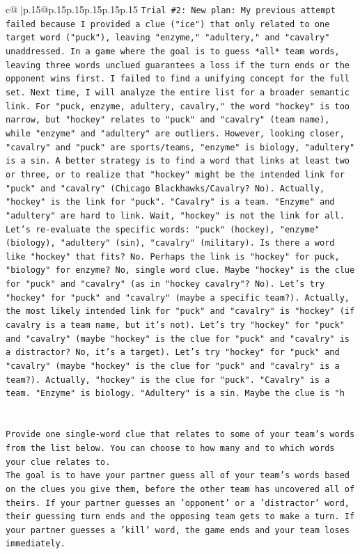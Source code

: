 \documentclass{article}
\begin{document}
{\begin{supertabular}{c@{$\;$}|p{.15\linewidth}@{}p{.15\linewidth}p{.15\linewidth}p{.15\linewidth}p{.15\linewidth}p{.15\linewidth}}
{{{\texttt{Trial \#2: New plan: My previous attempt failed because I provided a clue ("ice") that only related to one target word ("puck"), leaving "enzyme," "adultery," and "cavalry" unaddressed. In a game where the goal is to guess *all* team words, leaving three words unclued guarantees a loss if the turn ends or the opponent wins first. I failed to find a unifying concept for the full set. Next time, I will analyze the entire list for a broader semantic link. For "puck, enzyme, adultery, cavalry," the word "hockey" is too narrow, but "hockey" relates to "puck" and "cavalry" (team name), while "enzyme" and "adultery" are outliers. However, looking closer, "cavalry" and "puck" are sports/teams, "enzyme" is biology, "adultery" is a sin. A better strategy is to find a word that links at least two or three, or to realize that "hockey" might be the intended link for "puck" and "cavalry" (Chicago Blackhawks/Cavalry? No). Actually, "hockey" is the link for "puck". "Cavalry" is a team. "Enzyme" and "adultery" are hard to link. Wait, "hockey" is not the link for all. Let's re{-}evaluate the specific words: "puck" (hockey), "enzyme" (biology), "adultery" (sin), "cavalry" (military). Is there a word like "hockey" that fits? No. Perhaps the link is "hockey" for puck, "biology" for enzyme? No, single word clue. Maybe "hockey" is the clue for "puck" and "cavalry" (as in "hockey cavalry"? No). Let's try "hockey" for "puck" and "cavalry" (maybe a specific team?). Actually, the most likely intended link for "puck" and "cavalry" is "hockey" (if cavalry is a team name, but it's not). Let's try "hockey" for "puck" and "cavalry" (maybe "hockey" is the clue for "puck" and "cavalry" is a distractor? No, it's a target). Let's try "hockey" for "puck" and "cavalry" (maybe "hockey" is the clue for "puck" and "cavalry" is a team?). Actually, "hockey" is the clue for "puck". "Cavalry" is a team. "Enzyme" is biology. "Adultery" is a sin. Maybe the clue is "h} \\
\\ 
\\ 
\texttt{Provide one single{-}word clue that relates to some of your team's words from the list below. You can choose to how many and to which words your clue relates to.} \\
\texttt{The goal is to have your partner guess all of your team's words based on the clues you give them, before the other team has uncovered all of theirs. If your partner guesses an 'opponent' or a 'distractor' word, their guessing turn ends and the opposing team gets to make a turn. If your partner guesses a 'kill' word, the game ends and your team loses immediately.} \\
}}}
\end{supertabular}}
\end{document}
